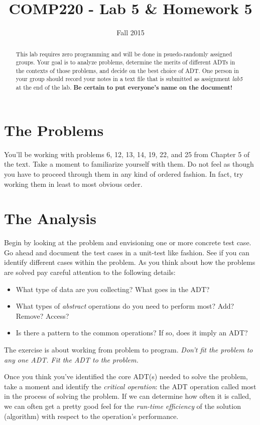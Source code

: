 \documentclass[10pt]{article}
\title{COMP220 - Lab 5 \& Homework 5}
\author{ }
\date{Fall 2015}
\begin{document}
\maketitle

\begin{abstract}
This lab requires zero programming and will be done in psuedo-randomly assigned groups. Your goal is to analyze problems, determine the merits of different ADTs in the contexts of those problems, and decide on the best choice of ADT. One person in your group should record your notes in a text file that is submitted as assignment \textit{lab5} at the end of the lab. \textbf{Be certain to put everyone's name on the document!}
\end{abstract}


\section{The Problems}

You'll be working with problems 6, 12, 13, 14, 19, 22, and 25 from Chapter 5 of the text. Take a moment to familiarize yourself with them. Do not feel as though you have to proceed through them in any kind of ordered fashion. In fact, try working them in least to most obvious order. 

\section{The Analysis}

Begin by looking at the problem and envisioning one or more concrete test case. Go ahead and document the test cases in a unit-test like fashion. See if you can identify different cases within the problem. As you think about how the problems are solved pay careful attention to the following details:
\begin{itemize}
\item What type of data are you collecting? What goes in the ADT? 
\item What types of \textit{abstract} operations do you need to perform most? Add? Remove? Access? 
\item Is there a pattern to the common operations? If so, does it imply an ADT? 
\end{itemize}
The exercise is about working from problem to program. \textit{Don't fit the problem to any one ADT. Fit the ADT to the problem.}

Once you think you've identified the core ADT(s) needed to solve the problem, take a moment and identify the \textit{critical operation}: the ADT operation called most in the process of solving the problem. If we can determine how often it is called, we can often get a pretty good feel for the \textit{run-time efficiency} of the solution (algorithm) with respect to the operation's performance. 
\end{document}
